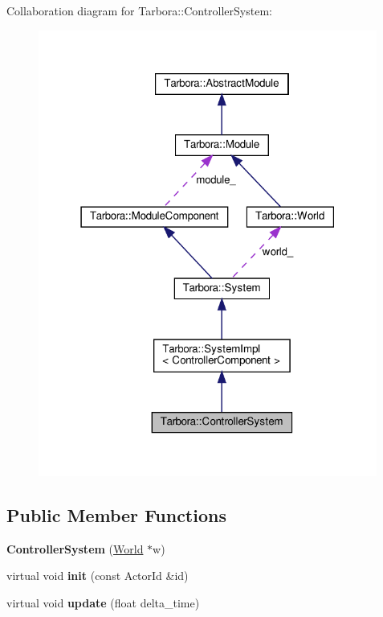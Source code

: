 Collaboration diagram for Tarbora\+:\+:Controller\+System\+:\nopagebreak
\begin{figure}[H]
\begin{center}
\leavevmode
\includegraphics[width=316pt]{classTarbora_1_1ControllerSystem__coll__graph}
\end{center}
\end{figure}
\subsection*{Public Member Functions}
\begin{DoxyCompactItemize}
\item 
\mbox{\label{classTarbora_1_1ControllerSystem_af2f2f8df2b467fb113fdcc38c48784e8}} 
{\bfseries Controller\+System} (\hyperlink{classTarbora_1_1World}{World} $\ast$w)
\item 
\mbox{\label{classTarbora_1_1ControllerSystem_ac117af8c62be21fe5bf9188b32606009}} 
virtual void {\bfseries init} (const Actor\+Id \&id)
\item 
\mbox{\label{classTarbora_1_1ControllerSystem_a3798b5b50d140e986a6cfc1b4467bc7b}} 
virtual void {\bfseries update} (float delta\+\_\+time)
\end{DoxyCompactItemize}
